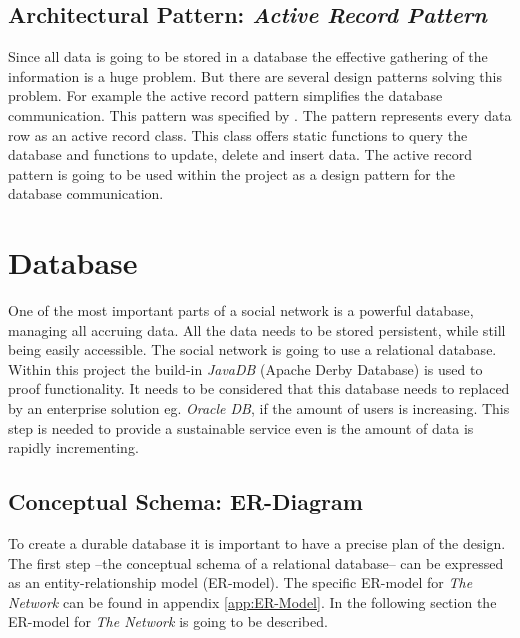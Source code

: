 \documentclass[11pt,a4paper]{report}
\begin{document}
\subsection{Architectural Pattern: \emph{Active Record Pattern}}
Since all data is going to be stored in a database the effective gathering of the information is a huge problem. But there are several design patterns solving this problem. For example the active record pattern simplifies the database communication. This pattern was specified by \textcite{Fowler:2003aa}. The pattern represents every data row as an active record class. This class offers static functions to query the database and functions to update, delete and insert data. The active record pattern is going to be used within the project as a design pattern for the database communication.

\section{Database}
One of the most important parts of a social network is a powerful database, managing all accruing data. All the data needs to be stored persistent, while still being easily accessible. The social network is going to use a relational database. Within this project the build-in \emph{JavaDB} (Apache Derby Database) is used to proof functionality. It needs to be considered that this database needs to replaced by an enterprise solution eg. \emph{Oracle DB}, if the amount of users is increasing. This step is needed to provide a sustainable service even is the amount of data is rapidly incrementing.

\subsection{Conceptual Schema: ER-Diagram}
To create a durable database it is important to have a precise plan of the design. The first step --the conceptual schema of a relational database-- can be expressed as an entity-relationship model (ER-model). The specific ER-model for \emph{The Network} can be found in appendix \vref{app:ER-Model}. In the following section the ER-model for \emph{The Network} is going to be described.
\end{document}
